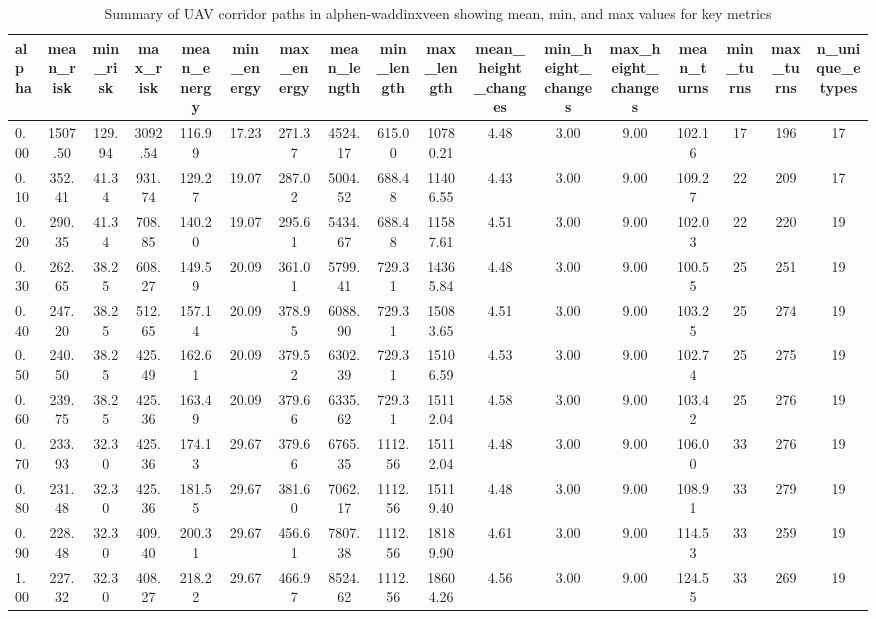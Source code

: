 \begin{table}
\caption{Summary of UAV corridor paths in alphen-waddinxveen showing mean, min, and max values for key metrics}
\label{tab:alphen-waddinxveen_summary_detailed}
\begin{tabular}{lcccccccccccccccc}
\toprule
alpha & mean_risk & min_risk & max_risk & mean_energy & min_energy & max_energy & mean_length & min_length & max_length & mean_height_changes & min_height_changes & max_height_changes & mean_turns & min_turns & max_turns & n_unique_etypes \\
\midrule
0.00 & 1507.50 & 129.94 & 3092.54 & 116.99 & 17.23 & 271.37 & 4524.17 & 615.00 & 10780.21 & 4.48 & 3.00 & 9.00 & 102.16 & 17 & 196 & 17 \\
0.10 & 352.41 & 41.34 & 931.74 & 129.27 & 19.07 & 287.02 & 5004.52 & 688.48 & 11406.55 & 4.43 & 3.00 & 9.00 & 109.27 & 22 & 209 & 17 \\
0.20 & 290.35 & 41.34 & 708.85 & 140.20 & 19.07 & 295.61 & 5434.67 & 688.48 & 11587.61 & 4.51 & 3.00 & 9.00 & 102.03 & 22 & 220 & 19 \\
0.30 & 262.65 & 38.25 & 608.27 & 149.59 & 20.09 & 361.01 & 5799.41 & 729.31 & 14365.84 & 4.48 & 3.00 & 9.00 & 100.55 & 25 & 251 & 19 \\
0.40 & 247.20 & 38.25 & 512.65 & 157.14 & 20.09 & 378.95 & 6088.90 & 729.31 & 15083.65 & 4.51 & 3.00 & 9.00 & 103.25 & 25 & 274 & 19 \\
0.50 & 240.50 & 38.25 & 425.49 & 162.61 & 20.09 & 379.52 & 6302.39 & 729.31 & 15106.59 & 4.53 & 3.00 & 9.00 & 102.74 & 25 & 275 & 19 \\
0.60 & 239.75 & 38.25 & 425.36 & 163.49 & 20.09 & 379.66 & 6335.62 & 729.31 & 15112.04 & 4.58 & 3.00 & 9.00 & 103.42 & 25 & 276 & 19 \\
0.70 & 233.93 & 32.30 & 425.36 & 174.13 & 29.67 & 379.66 & 6765.35 & 1112.56 & 15112.04 & 4.48 & 3.00 & 9.00 & 106.00 & 33 & 276 & 19 \\
0.80 & 231.48 & 32.30 & 425.36 & 181.55 & 29.67 & 381.60 & 7062.17 & 1112.56 & 15119.40 & 4.48 & 3.00 & 9.00 & 108.91 & 33 & 279 & 19 \\
0.90 & 228.48 & 32.30 & 409.40 & 200.31 & 29.67 & 456.61 & 7807.38 & 1112.56 & 18189.90 & 4.61 & 3.00 & 9.00 & 114.53 & 33 & 259 & 19 \\
1.00 & 227.32 & 32.30 & 408.27 & 218.22 & 29.67 & 466.97 & 8524.62 & 1112.56 & 18604.26 & 4.56 & 3.00 & 9.00 & 124.55 & 33 & 269 & 19 \\
\bottomrule
\end{tabular}
\end{table}
